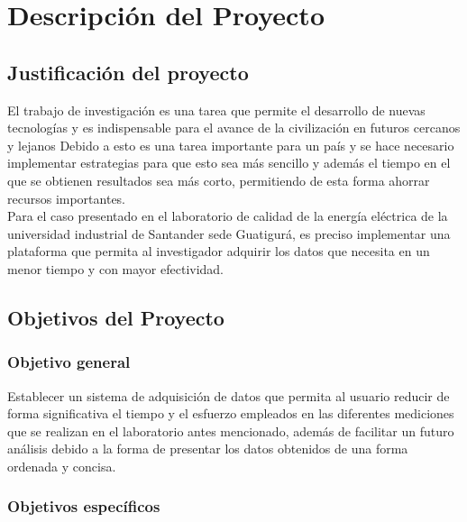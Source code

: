 
\chapter{Descripción del Proyecto}

\section{Justificación del proyecto}

El trabajo de investigación es una tarea que permite el desarrollo de nuevas tecnologías y es indispensable para el avance de la civilización en futuros cercanos y lejanos \cite{Noguera2016}  %
Debido a esto es una tarea importante para un país y se hace necesario implementar estrategias para que esto sea más sencillo y además el tiempo en el que se obtienen resultados sea más corto, permitiendo de esta forma ahorrar recursos importantes. \\  

Para el caso presentado en el laboratorio de calidad de la energía eléctrica de la universidad industrial de Santander sede Guatigurá, es preciso implementar una plataforma que permita al investigador adquirir los datos que necesita en un menor tiempo y con mayor efectividad.  


\section{Objetivos del Proyecto}

\subsection{Objetivo general}

Establecer un sistema de adquisición de datos que permita al usuario reducir de forma significativa el tiempo y el esfuerzo empleados en las diferentes mediciones que se realizan en el laboratorio antes mencionado, además de facilitar un futuro análisis debido a la forma de presentar los datos obtenidos de una forma ordenada y concisa. 

\subsection{Objetivos específicos}

